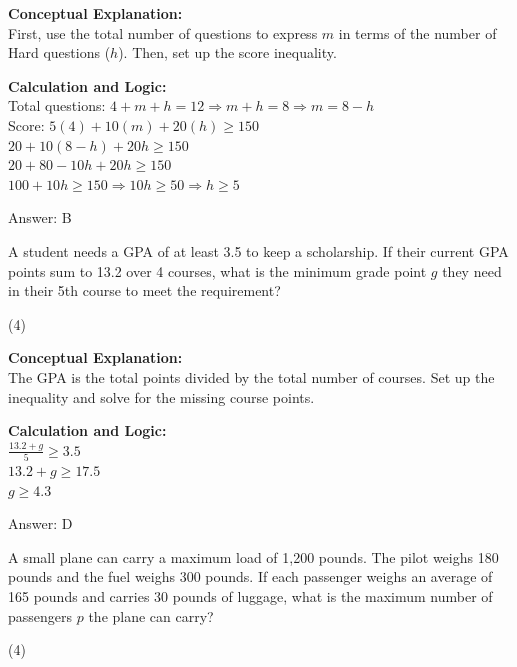 \documentclass[11pt,paper=a4,answers]{exam}
\begin{document}
\begin{questions}
\begin{solution}
\textbf{Conceptual Explanation:} \\
First, use the total number of questions to express $m$ in terms of the number of Hard questions ($h$). Then, set up the score inequality.

\vspace{10pt}
\textbf{Calculation and Logic:} \\
Total questions: $4 + m + h = 12 \Rightarrow m + h = 8 \Rightarrow m = 8 - h$ \\
Score: $5(4) + 10(m) + 20(h) \ge 150$ \\
$20 + 10(8 - h) + 20h \ge 150$ \\
$20 + 80 - 10h + 20h \ge 150$ \\
$100 + 10h \ge 150 \Rightarrow 10h \ge 50 \Rightarrow h \ge 5$

\vspace{15pt}
Answer: \colorbox{yellow!100}{B}
\end{solution}

\vspace{20pt}

\question
A student needs a GPA of at least 3.5 to keep a scholarship. If their current GPA points sum to 13.2 over 4 courses, what is the minimum grade point $g$ they need in their 5th course to meet the requirement?
\begin{tasks}(4)
\end{tasks}

\begin{solution}
\textbf{Conceptual Explanation:} \\
The GPA is the total points divided by the total number of courses. Set up the inequality and solve for the missing course points.

\vspace{10pt}
\textbf{Calculation and Logic:} \\
$\frac{13.2 + g}{5} \ge 3.5$ \\
$13.2 + g \ge 17.5$ \\
$g \ge 4.3$

\vspace{15pt}
Answer: \colorbox{yellow!100}{D}
\end{solution}

\vspace{20pt}

\question
A small plane can carry a maximum load of 1,200 pounds. The pilot weighs 180 pounds and the fuel weighs 300 pounds. If each passenger weighs an average of 165 pounds and carries 30 pounds of luggage, what is the maximum number of passengers $p$ the plane can carry?
\begin{tasks}(4)
\end{tasks}


\end{questions}
\end{document}
